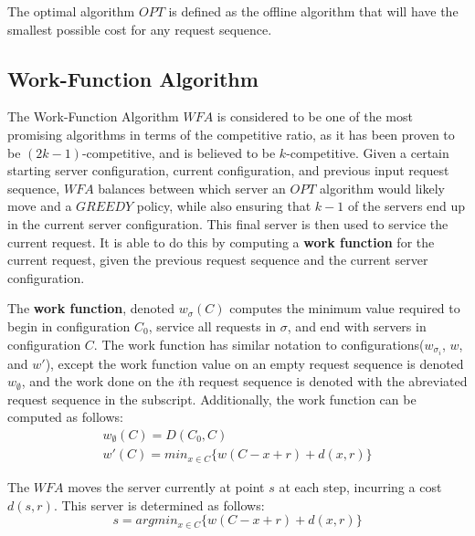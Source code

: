 \begin{definition}
    The optimal algorithm $OPT$ is defined as the offline algorithm that will have the smallest possible cost for any request sequence.
\end{definition}

\subsection{Work-Function Algorithm}
\label{sec:WFA}
The Work-Function Algorithm $WFA$ is considered to be one of the most promising algorithms in terms of the competitive ratio, as it has been proven to be $(2k-1)$-competitive, and is believed to be $k$-competitive. Given a certain starting server configuration, current configuration, and previous input request sequence, $WFA$ balances between which server an $OPT$ algorithm would likely move and a $GREEDY$ policy, while also ensuring that $k-1$ of the servers end up in the current server configuration. This final server is then used to service the current request. It is able to do this by computing a \textbf{work function} for the current request, given the previous request sequence and the current server configuration.

\begin{definition}
    The \textbf{work function}, denoted $w_\sigma(C)$ computes the minimum value required to begin in configuration $C_0$, service all requests in $\sigma$, and end with servers in configuration $C$. The work function has similar notation to configurations($w_{\sigma_i}$, $w$, and $w'$), except the work function value on an empty request sequence is denoted $w_\emptyset$, and the work done on the $i$th request sequence is denoted with the abreviated request sequence in the subscript. Additionally, the work function can be computed as follows:
    \begin{equation*}
        \begin{gathered}
            w_\emptyset(C) = D(C_0, C) \\
            w'(C) = min_{x \in C} \{ w(C - x + r) + d(x, r)\}
        \end{gathered}
    \end{equation*}
\end{definition}

\begin{definition}
    The $WFA$ moves the server currently at point $s$ at each step, incurring a cost $d(s,r)$. This server is determined as follows:
    \begin{equation*}
        s = argmin_{x \in C} \{ w(C-x+r) + d(x,r)\}
    \end{equation*}
\end{definition}

